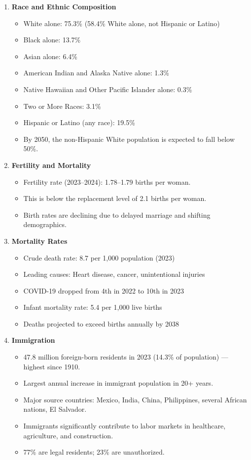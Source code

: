 \begin{enumerate}
    \item \textbf{Race and Ethnic Composition}
    \begin{itemize}
        \item White alone: 75.3\% (58.4\% White alone, not Hispanic or Latino)
        \item Black alone: 13.7\%
        \item Asian alone: 6.4\%
        \item American Indian and Alaska Native alone: 1.3\%
        \item Native Hawaiian and Other Pacific Islander alone: 0.3\%
        \item Two or More Races: 3.1\%
        \item Hispanic or Latino (any race): 19.5\%
        \item By 2050, the non-Hispanic White population is expected to fall below 50\%.
    \end{itemize}

    \item \textbf{Fertility and Mortality}
    \begin{itemize}
        \item Fertility rate (2023--2024): 1.78--1.79 births per woman.
        \item This is below the replacement level of 2.1 births per woman.
        \item Birth rates are declining due to delayed marriage and shifting demographics.
    \end{itemize}

    \item \textbf{Mortality Rates}
    \begin{itemize}
        \item Crude death rate: 8.7 per 1,000 population (2023)
        \item Leading causes: Heart disease, cancer, unintentional injuries
        \item COVID-19 dropped from 4th in 2022 to 10th in 2023
        \item Infant mortality rate: 5.4 per 1,000 live births
        \item Deaths projected to exceed births annually by 2038
    \end{itemize}

    \item \textbf{Immigration}
    \begin{itemize}
        \item 47.8 million foreign-born residents in 2023 (14.3\% of population) — highest since 1910.
        \item Largest annual increase in immigrant population in 20+ years.
        \item Major source countries: Mexico, India, China, Philippines, several African nations, El Salvador.
        \item Immigrants significantly contribute to labor markets in healthcare, agriculture, and construction.
        \item 77\% are legal residents; 23\% are unauthorized.
    \end{itemize}
\end{enumerate}
